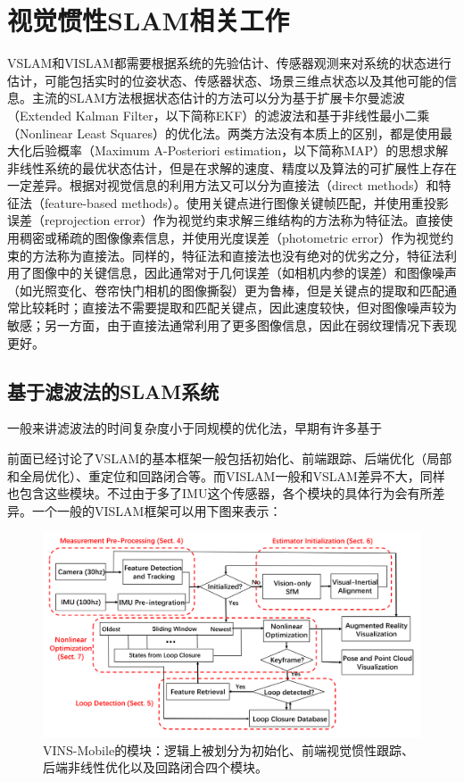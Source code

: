 \section{视觉惯性SLAM相关工作}

VSLAM和VISLAM都需要根据系统的先验估计、传感器观测来对系统的状态进行估计，可能包括实时的位姿状态、传感器状态、场景三维点状态以及其他可能的信息。主流的SLAM方法根据状态估计的方法可以分为基于扩展卡尔曼滤波（Extended Kalman Filter，以下简称EKF）的滤波法和基于非线性最小二乘（Nonlinear Least Squares）的优化法。两类方法没有本质上的区别，都是使用最大化后验概率（Maximum A-Posteriori estimation，以下简称MAP）的思想求解非线性系统的最优状态估计，但是在求解的速度、精度以及算法的可扩展性上存在一定差异。根据对视觉信息的利用方法又可以分为直接法（direct methods）和特征法（feature-based methods）。使用关键点进行图像关键帧匹配，并使用重投影误差（reprojection error）作为视觉约束求解三维结构的方法称为特征法。直接使用稠密或稀疏的图像像素信息，并使用光度误差（photometric error）作为视觉约束的方法称为直接法。同样的，特征法和直接法也没有绝对的优劣之分，特征法利用了图像中的关键信息，因此通常对于几何误差（如相机内参的误差）和图像噪声（如光照变化、卷帘快门相机的图像撕裂）更为鲁棒，但是关键点的提取和匹配通常比较耗时；直接法不需要提取和匹配关键点，因此速度较快，但对图像噪声较为敏感；另一方面，由于直接法通常利用了更多图像信息，因此在弱纹理情况下表现更好。

\subsection{基于滤波法的SLAM系统}

一般来讲滤波法的时间复杂度小于同规模的优化法，早期有许多基于

前面已经讨论了VSLAM的基本框架一般包括初始化、前端跟踪、后端优化（局部和全局优化）、重定位和回路闭合等。而VISLAM一般和VSLAM差异不大，同样也包含这些模块。不过由于多了IMU这个传感器，各个模块的具体行为会有所差异。一个一般的VISLAM框架可以用下图来表示：

\begin{figure}[htb!]
    \centering
    \includegraphics[width=\textwidth]{figs/vins_model.png}
    \caption{VINS-Mobile\citep{li2017monocular}的模块：逻辑上被划分为初始化、前端视觉惯性跟踪、后端非线性优化以及回路闭合四个模块。}
    \label{fig:vins_model}
\end{figure}

